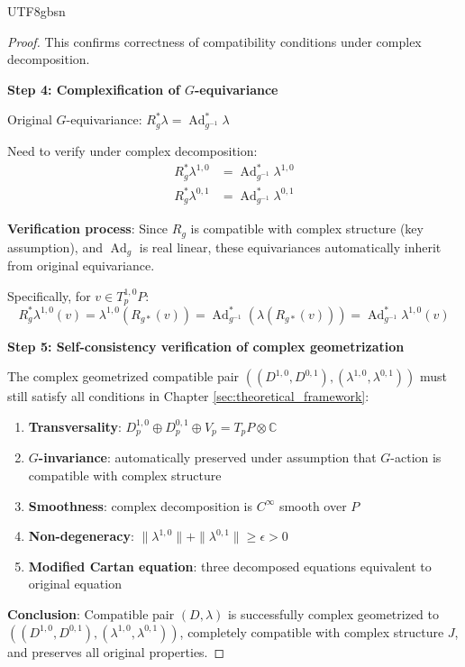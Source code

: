 \documentclass[a4paper,12pt]{extarticle}
\theoremstyle{definition}
\begin{document}
\begin{CJK}{UTF8}{gbsn}
\begin{proof}
This confirms correctness of compatibility conditions under complex decomposition.

\textbf{Step 4: Complexification of $G$-equivariance}

Original $G$-equivariance: $R_g^*\lambda = \operatorname{Ad}^*_{g^{-1}}\lambda$

Need to verify under complex decomposition:
\begin{align}
R_g^*\lambda^{1,0} &= \operatorname{Ad}^*_{g^{-1}}\lambda^{1,0} \\
R_g^*\lambda^{0,1} &= \operatorname{Ad}^*_{g^{-1}}\lambda^{0,1}
\end{align}

\textbf{Verification process}:
Since $R_g$ is compatible with complex structure (key assumption), and $\operatorname{Ad}_g$ is real linear, these equivariances automatically inherit from original equivariance.

Specifically, for $v \in T^{1,0}_pP$:
\begin{equation}
R_g^*\lambda^{1,0}(v) = \lambda^{1,0}(R_{g*}(v)) = \operatorname{Ad}^*_{g^{-1}}(\lambda(R_{g*}(v))) = \operatorname{Ad}^*_{g^{-1}}\lambda^{1,0}(v)
\end{equation}

\textbf{Step 5: Self-consistency verification of complex geometrization}

The complex geometrized compatible pair $((D^{1,0}, D^{0,1}), (\lambda^{1,0}, \lambda^{0,1}))$ must still satisfy all conditions in Chapter \ref{sec:theoretical_framework}:

\begin{enumerate}
    \item \textbf{Transversality}: $D^{1,0}_p \oplus D^{0,1}_p \oplus V_p = T_pP \otimes \mathbb{C}$
    \item \textbf{$G$-invariance}: automatically preserved under assumption that $G$-action is compatible with complex structure
    \item \textbf{Smoothness}: complex decomposition is $C^\infty$ smooth over $P$
    \item \textbf{Non-degeneracy}: $\|\lambda^{1,0}\| + \|\lambda^{0,1}\| \geq \epsilon > 0$
    \item \textbf{Modified Cartan equation}: three decomposed equations equivalent to original equation
\end{enumerate}

\textbf{Conclusion}: Compatible pair $(D,\lambda)$ is successfully complex geometrized to $((D^{1,0}, D^{0,1}), (\lambda^{1,0}, \lambda^{0,1}))$, completely compatible with complex structure $J$, and preserves all original properties.
\end{proof}


\end{CJK}
\end{document}
